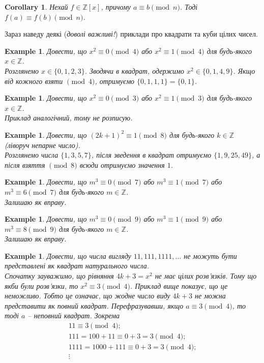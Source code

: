 \documentclass[a4paper, 10pt]{article}
\theoremstyle{theoremdd}
\theoremstyle{theoremdd}
\theoremstyle{theoremdd}
\theoremstyle{theoremdd}
\newtheorem{example}[theorem]{Example}
\theoremstyle{theoremdd}
\theoremstyle{theoremdd}
\theoremstyle{theoremdd}
\theoremstyle{theoremdd}
\newtheorem{corollary}[theorem]{Corollary}
\begin{document}
\begin{corollary}
Нехай $f \in \mathbb{Z}[x]$, причому $a \equiv b \pmod n$. Тоді $f(a) \equiv f(b) \pmod n$.
\end{corollary}

Зараз наведу деякі (\textit{доволі важливі!}) приклади про квадрати та куби цілих чисел.

\begin{example}
Довести, що $x^2 \equiv 0 \pmod 4$ або $x^2 \equiv 1 \pmod 4$ для будь-якого $x \in \mathbb{Z}$.
\bigskip \\
Розглянемо $x \in \{0,1,2,3\}$. Зводячи в квадрат, одержимо $x^2 \in \{0,1,4,9\}$. Якщо від кожного взяти $\!\! \pmod 4$, отримуємо $\{0,1,1,1\} = \{0,1\}$.
\end{example}

\begin{example}
Довести, що $x^2 \equiv 0 \pmod 3$ або $x^2 \equiv 1 \pmod 3$ для будь-якого $x \in \mathbb{Z}$.\\
\textit{Приклад аналогічний, тому не розписую.}
\end{example}

\begin{example}
Довести, що $(2k+1)^2 \equiv 1 \pmod 8$ для будь-якого $k \in \mathbb{Z}$ (\textit{ліворуч непарне число}).
\bigskip \\
Розглянемо числа $\{1,3,5,7\}$, після зведення в квадрат отримуємо $\{1,9,25,49\}$, а після взяття $\!\! \pmod 8$ всюди отримуємо значення $1$.
\end{example}

\begin{example}
Довести, що $m^3 \equiv 0 \pmod 7$ або $m^3 \equiv 1 \pmod 7$ або $m^3 \equiv 6 \pmod 7$ для будь-якого $m \in \mathbb{Z}$.\\
\textit{Залишаю як вправу.}
\end{example}

\begin{example}
Довести, що $m^3 \equiv 0 \pmod 9$ або $m^3 \equiv 1 \pmod 9$ або $m^3 \equiv 8 \pmod 9$ для будь-якого $m \in \mathbb{Z}$.\\
\textit{Залишаю як вправу.}
\end{example}

\begin{example}
Довести, що числа вигляду $11, 111, 1111, \dots$ не можуть бути представлені як квадрат натурального числа.
\bigskip \\
Спочатку зауважимо, що рівняння $4k+3 = x^2$ не має цілих розв'язків. Тому що якби були розв'язки, то $x^2 \equiv 3 \pmod 4$. Приклад вище показує, що це неможливо. Тобто це означає, що жодне число виду $4k+3$ не можна представити як повний квадрат. Перефразувавши, якщо $a \equiv 3 \pmod 4$, то тоді $a$ -- неповний квадрат. Зокрема
\begin{align*}
11 \equiv 3 \pmod 4; \\
111 = 100 + 11 \equiv 0 + 3 = 3 \pmod 4; \\
1111 = 1000 + 111 \equiv 0 + 3 = 3 \pmod 4; \\
\vdots
\end{align*}
\end{example}
\end{document}
